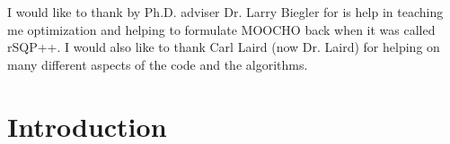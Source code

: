 \documentclass[pdf,12pt,report]{SANDreport}
\begin{document}
I would like to thank by Ph.D. adviser Dr. Larry Biegler for is help in
teaching me optimization and helping to formulate MOOCHO back when it was
called rSQP++.  I would also like to thank Carl Laird (now Dr. Laird) for
helping on many different aspects of the code and the algorithms.

%
\cleardoublepage		%
\tableofcontents
\listoffigures







%
\SANDmain		%

%
\section{Introduction}
%
\end{document}

